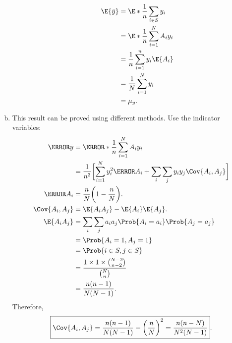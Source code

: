 \documentclass[oneside]{book}\usepackage[]{graphicx}\usepackage[svgnames]{xcolor}
\begin{document}
\begin{Result}{}
\begin{enumerate}[(a)]
\begin{itemize}
\begin{align*}
                                    \E{\bar{y}}  & =\E*{\frac{1}{n}\sum_{i\in S}y_i}                                           \\
                                                 & =\E*{\frac{1}{n}\sum_{i=1}^{N}A_i y_i}                                      \\
                                                 & =\frac{1}{n}\sum_{i=1}^{n}y_i\E{A_i}                                        \\
                                                 & =\frac{1}{N}\sum_{i=1}^{N}y_i                                               \\
                                                 & =\mu_y.
                              \end{align*}
                  \end{itemize}
            \item This result can be proved using different methods. Use the indicator variables:
                  \begin{align*}
                        \V{\bar{y}}
                                      & =\V*{\frac{1}{n}\sum_{i=1}^{N}A_i y_i}                 \\
                                      & =\frac{1}{n^2}\biggl[\sum_{i=1}^{N}y_i^2\V{A_i}+
                        \sum_i\sum_j y_iy_j\Cov{A_i,A_j}\biggr]                                \\
                        \V{A_i}       & =\frac{n}{N}\biggl(1-\frac{n}{N}\biggr).               \\
                        \Cov{A_i,A_j} & =\E{A_iA_j}-\E{A_i}\E{A_j}.                            \\
                        \E{A_iA_j}    & =\sum_i\sum_j a_ia_j \Prob{A_i=a_i}\Prob{A_j=a_j}      \\
                                      & =\Prob{A_i=1,A_j=1}                                    \\
                                      & =\Prob{i\in S,j\in S}                                  \\
                                      & =\frac{1\times 1\times \binom{N-2}{n-2}}{\binom{N}{n}} \\
                                      & =\frac{n(n-1)}{N(N-1)}.
                  \end{align*}
                  Therefore,
                  \[ \boxed{\Cov{A_i,A_j}=\frac{n(n-1)}{N(N-1)}-\biggl(\frac{n}{N}\biggr)^2=\frac{n(n-N)}{N^2(N-1)}}. \]

\end{enumerate}
\end{Result}
\end{document}
